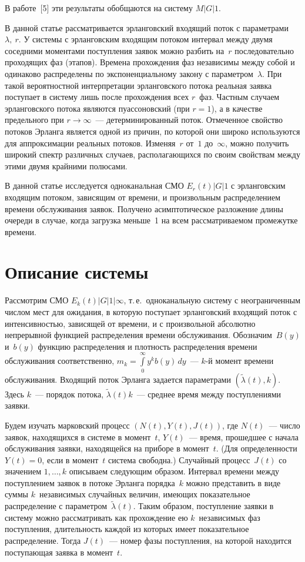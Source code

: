 \begin{multicols}{2}
В работе~[5] эти результаты обобщаются на сис\-те\-му $M\vert G\vert 1$.

 В данной статье рассматривается эрланговский
входящий поток с параметрами~$\lambda,\ r$. У системы с эрланговским
входящим потоком интервал между двумя соседними моментами
поступления заявок можно разбить на~$r$ последовательно проходящих фаз
(этапов). Времена прохождения фаз независимы между собой и
одинаково распределены по экспоненциальному закону с параметром~$\lambda$. 
При такой вероятностной интерпретации эрланговского
потока реальная заявка поступает в систему лишь после прохождения
всех $r$~фаз. Частным случаем  эрланговского потока являются пуассоновский (при $r = 1$), а в
качестве предельного при $ r \rightarrow\infty$~--- детерминированный поток.
Отмеченное свойство потоков  Эрланга является одной из причин, по которой
они широко используются для аппроксимации реальных потоков. Изменяя~$r$ от~$1$ до~$\infty$, 
можно получить широкий спектр различных случаев, располагающихся по своим свойствам между этими двумя
крайними полюсами.

 В данной статье исследуется одноканальная СМО $E_{r}(t)\vert G\vert 1$
 с эрланговским входящим потоком, зависящим от времени, и
произвольным распределением времени обслуживания заявок. Получено
асимптотическое разложение длины очереди в случае, когда загрузка
меньше~1 на всем рассматриваемом промежутке времени.

\section {Описание системы} 

Рассмотрим СМО $E_{k}(t)\vert G\vert 1\vert \infty$,  т.\,е.\ одноканальную
систему с неограниченным числом мест для ожидания, в которую
поступает эрланговский входящий поток с интенсивностью, зависящей от
времени, и с произвольной абсолютно непрерывной функцией распределения времени
обслуживания. Обозначим~$B(y)$ и~$b(y)$ функцию распределения и плотность распределения времени
обслуживания  соответственно,
$m_{k}=\int\limits_{0}^{\infty}y^{k} b(y)\,dy$~--- $k$-й момент времени обслуживания.
Входящий поток Эрланга задается параметрами
$(\widetilde{\lambda}(t),k).$ Здесь $k$~--- порядок потока,
$\widetilde{\lambda}(t) k$~--- среднее время между поступлениями заявки.

Будем изучать марковский процесс
$(N(t),Y(t),J(t))$, где $N(t)$~---  число заявок, находящихся в системе в момент~$t$,
 $Y(t)$~--- время, прошедшее с начала обслуживания заявки, находящейся на
приборе в момент~$t$.  (Для определенности $Y(t)=0$, если  в момент~$t$ система свободна.)
Случайный процесс~$J(t)$ со значением $1,\ldots,k$ описываем
следующим образом. Интервал времени между поступлением заявок в
потоке Эрланга порядка~$k$ можно представить в виде суммы $k$~независимых 
случайных величин, имеющих показательное распределение с
па\-ра\-мет\-ром~$\widetilde{\lambda}(t)$. Таким образом, поступление
заявки в систему можно рассматривать как прохождение ею $k$~независимых фаз поступления, длительность каж\-дой из которых имеет
показательное распределение. Тогда $J(t)$~--- номер фазы поступления,
на которой находится поступающая заявка в момент~$t$.


\end{multicols}
